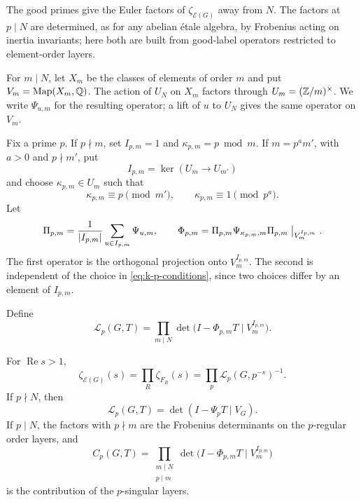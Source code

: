 The good primes give the Euler factors of \(\zeta_{\mathcal E(G)}\) away
from \(N\).  The factors at \(p\mid N\) are determined, as for any
abelian étale algebra, by Frobenius acting on inertia invariants; here both
are built from good-label operators restricted to element-order layers.

For \(m\mid N\), let \(X_m\) be the classes of elements of order \(m\)
and put \(V_m=\operatorname{Map}(X_m,\mathbb Q)\).  The action of \(U_N\) on
\(X_m\) factors through \(U_m=(\mathbb Z/m)^\times\).  We write
\(\Psi_{u,m}\) for the resulting operator; a lift of \(u\) to \(U_N\)
gives the same operator on \(V_m\).

Fix a prime \(p\).  If \(p\nmid m\), set \(I_{p,m}=1\) and
\(\kappa_{p,m}=p\bmod m\).  If \(m=p^am'\), with \(a>0\) and
\(p\nmid m'\), put
\[
 I_{p,m}=\ker(U_m\longrightarrow U_{m'})
\]
and choose \(\kappa_{p,m}\in U_m\) such that
\begin{equation}
 \kappa_{p,m}\equiv p\pmod{m'},\qquad
 \kappa_{p,m}\equiv1\pmod{p^a}.
 \label{eq:k-p-conditions}
\end{equation}
Let
\begin{equation}
 \Pi_{p,m}=\frac1{|I_{p,m}|}
 \sum_{u\in I_{p,m}}\Psi_{u,m},
 \qquad
 \Phi_{p,m}
 =\Pi_{p,m}\Psi_{\kappa_{p,m},m}\Pi_{p,m}
 \bigm|_{V_m^{I_{p,m}}}.
 \label{eq:frobenius-operator}
\end{equation}
The first operator is the orthogonal projection onto
\(V_m^{I_{p,m}}\).  The second is independent of the choice in
\eqref{eq:k-p-conditions}, since two choices differ by an element of
\(I_{p,m}\).

Define
\begin{equation}
 \mathcal L_p(G,T)=
 \prod_{m\mid N}
 \det\bigl(I-\Phi_{p,m}T\mid V_m^{I_{p,m}}\bigr).
 \label{eq:complete-local-polynomial}
\end{equation}

\begin{theorem}
\label{thm:ramified-completion}
For \(\operatorname{Re}s>1\),
\begin{equation}
 \zeta_{\mathcal E(G)}(s)
 =\prod_R\zeta_{F_R}(s)
 =\prod_p\mathcal L_p(G,p^{-s})^{-1}.
 \label{eq:complete-euler-product}
\end{equation}
If \(p\nmid N\), then
\[
 \mathcal L_p(G,T)=\det(I-\Psi_pT\mid V_G).
\]
If \(p\mid N\), the factors with \(p\nmid m\) are the Frobenius
determinants on the \(p\)-regular order layers, and
\begin{equation}
 C_p(G,T)=
 \prod_{\substack{m\mid N\\p\mid m}}
 \det\bigl(I-\Phi_{p,m}T\mid V_m^{I_{p,m}}\bigr)
 \label{eq:Cp-polynomial}
\end{equation}
is the contribution of the \(p\)-singular layers.
\end{theorem}

